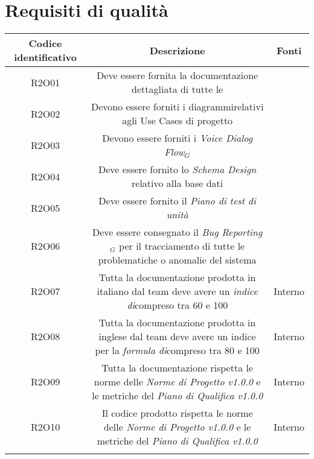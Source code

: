 \section{Requisiti di qualità}
\begin{tabularx}{\textwidth}{|C|C|C|}
	\hline
	\textbf{Codice identificativo} & \textbf{Descrizione} & \textbf{Fonti} \\
	\hline
	\endhead
	R2O01 & Deve essere fornita la documentazione dettagliata di tutte le  & \\
	\hline
	R2O02 & Devono essere forniti i diagrammirelativi agli Use Cases di progetto  & \\
	\hline
	R2O03 & Devono essere forniti i \textit{Voice Dialog Flow$_{G}$} & \\
	\hline
	R2O04 & Deve essere fornito lo \textit{Schema Design} relativo alla base dati  & \\
	\hline
	R2O05 & Deve essere fornito il \textit{Piano di test di unità} & \\
	\hline
	R2O06 & Deve essere consegnato il \textit{Bug Reporting$_{G}$} per il tracciamento di
	tutte le problematiche o anomalie del sistema & \\
	\hline
	R2O07 & Tutta la documentazione prodotta in italiano dal team deve avere
	un \textit{indice di}compreso tra 60 e 100 & Interno\\
	\hline
	R2O08 & Tutta la documentazione prodotta in inglese dal team deve avere
	un indice per la \textit{formula di}compreso tra 80 e 100 & Interno\\
	\hline
	R2O09 & Tutta la documentazione rispetta le norme delle \textit{Norme di Progetto v1.0.0} e le metriche del \textit{Piano di Qualifica v1.0.0}& Interno\\
	\hline
	R2O10 & Il codice prodotto rispetta le norme delle \textit{Norme di Progetto v1.0.0} e le metriche del \textit{Piano di Qualifica v1.0.0}& Interno\\
	\hline
    \caption{Tabella requisiti di qualità}
\end{tabularx}

